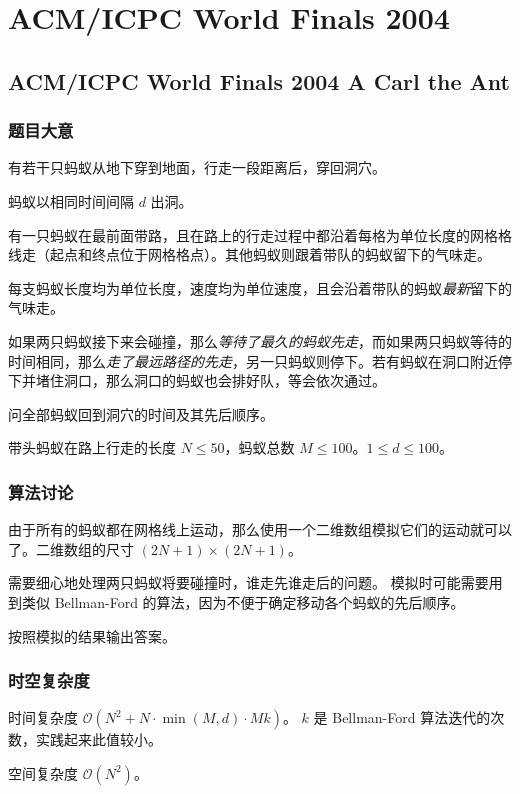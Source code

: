 
	\section{ACM/ICPC World Finals 2004}
		\subsection{ACM/ICPC World Finals 2004 A Carl the Ant}
			\subsubsection{题目大意}
				有若干只蚂蚁从地下穿到地面，行走一段距离后，穿回洞穴。
				
				蚂蚁以相同时间间隔 $d$ 出洞。
				
				有一只蚂蚁在最前面带路，且在路上的行走过程中都沿着每格为单位长度的网格格线走（起点和终点位于网格格点）。其他蚂蚁则跟着带队的蚂蚁留下的气味走。
				
				每支蚂蚁长度均为单位长度，速度均为单位速度，且会沿着带队的蚂蚁\emph{最新}留下的气味走。
				
				如果两只蚂蚁接下来会碰撞，那么\emph{等待了最久的蚂蚁先走}，而如果两只蚂蚁等待的时间相同，那么\emph{走了最远路径的先走}，另一只蚂蚁则停下。若有蚂蚁在洞口附近停下并堵住洞口，那么洞口的蚂蚁也会排好队，等会依次通过。
				
				问全部蚂蚁回到洞穴的时间及其先后顺序。
				
				带头蚂蚁在路上行走的长度 $N\le 50$，蚂蚁总数 $M \le 100$。$1 \le d \le 100$。
			\subsubsection{算法讨论}
				由于所有的蚂蚁都在网格线上运动，那么使用一个二维数组模拟它们的运动就可以了。二维数组的尺寸 $(2N + 1) \times (2N + 1)$。
				
				需要细心地处理两只蚂蚁将要碰撞时，谁走先谁走后的问题。
				模拟时可能需要用到类似 Bellman-Ford 的算法，因为不便于确定移动各个蚂蚁的先后顺序。
				
				按照模拟的结果输出答案。
			\subsubsection{时空复杂度}
				时间复杂度 $\mathcal{O}\left(N^2 + N \cdot \min(M,d)\cdot M k\right)$。 $k$ 是 Bellman-Ford 算法迭代的次数，实践起来此值较小。
					
				空间复杂度 $\mathcal{O}\left(N^2\right)$。


